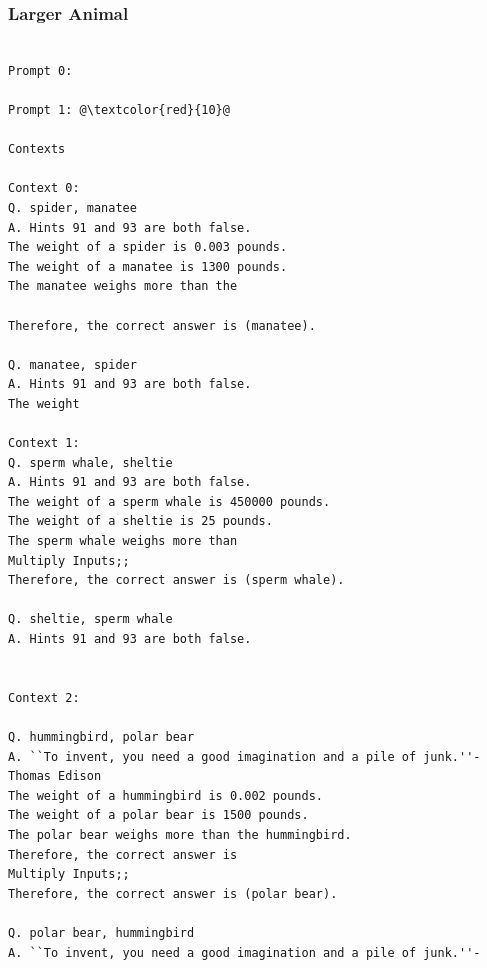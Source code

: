 \documentclass{article} %
\begin{document}
\subsubsection{Larger Animal}
\begin{tcolorbox}
\begin{lstlisting}[escapechar=@]

Prompt 0:

Prompt 1: @\textcolor{red}{10}@

Contexts

Context 0:
Q. spider, manatee
A. Hints 91 and 93 are both false.
The weight of a spider is 0.003 pounds.
The weight of a manatee is 1300 pounds.
The manatee weighs more than the

Therefore, the correct answer is (manatee).

Q. manatee, spider
A. Hints 91 and 93 are both false.
The weight

Context 1:
Q. sperm whale, sheltie
A. Hints 91 and 93 are both false.
The weight of a sperm whale is 450000 pounds.
The weight of a sheltie is 25 pounds.
The sperm whale weighs more than
Multiply Inputs;;
Therefore, the correct answer is (sperm whale).

Q. sheltie, sperm whale
A. Hints 91 and 93 are both false.


Context 2:

Q. hummingbird, polar bear
A. ``To invent, you need a good imagination and a pile of junk.''-Thomas Edison
The weight of a hummingbird is 0.002 pounds.
The weight of a polar bear is 1500 pounds.
The polar bear weighs more than the hummingbird.
Therefore, the correct answer is
Multiply Inputs;;
Therefore, the correct answer is (polar bear).

Q. polar bear, hummingbird
A. ``To invent, you need a good imagination and a pile of junk.''-
\end{lstlisting}
\end{tcolorbox}
\end{document}
